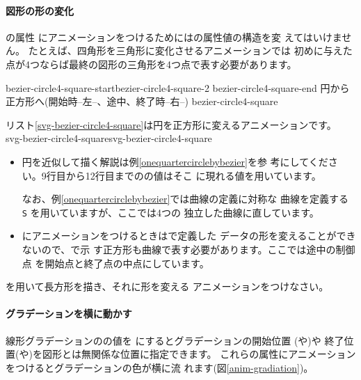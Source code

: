 \paragraph{図形の形の変化}の属性
にアニメーションをつけるためにはの属性値の構造を変
えてはいけません。
たとえば、四角形を三角形に変化させるアニメーションでは
初めに与えた点が4つならば最終の図形の三角形を4つ点で表す必要があります。

{{bezier-circle4-square-start}{bezier-circle4-square-2}%
{bezier-circle4-square-end}}
{円から正方形へ(開始時--左--、途中、終了時--右--)}
{bezier-circle4-square} 

リスト\ref{svg-bezier-circle4-square}は円を正方形に変えるアニメーションです。
%
{svg-bezier-circle4-square}{svg-bezier-circle4-square}
\begin{itemize}
 \item 円を近似して描く解説は例\ref{onequartercirclebybezier}を参
       考にしてください。9行目から12行目までのの値はそこ
       に現れる値を用いています。

       なお、例\ref{onequartercirclebybezier}では曲線の定義に対称な
       \Bezier 曲線を定義する \texttt{S} を用いていますが、ここでは4つの
       独立した\Bezier 曲線に直しています。
 \item {}にアニメーションをつけるときはで定義した
       データの形を変えることができないので、で示
       す正方形も\Bezier 曲線で表す必要があります。ここでは途中の制御点
       を開始点と終了点の中点にしています。
\end{itemize}
\begin{Problem}
 を用いて長方形を描き、それに形を変える
 アニメーションをつけなさい。
\end{Problem}
\fi
\paragraph{グラデーションを横に動かす}
線形グラデーションのの値を
にするとグラデーションの開始位置
(や)や
終了位置(や)を図形とは無関係な位置に指定できます。
これらの属性にアニメーションをつけるとグラデーションの色が横に流
れます(図\ref{anim-gradiation})。

